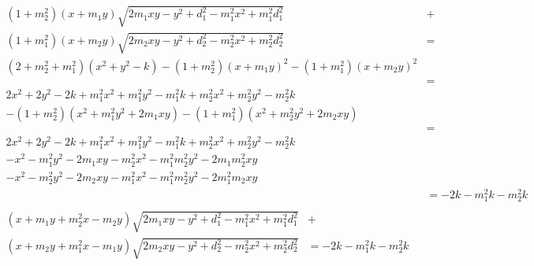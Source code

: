 \documentclass{article}
\begin{document}
\begin{align*}
  (1 + m_2^2)(x + m_1 y)\sqrt{2 m_1 x y - y^2 + d_1^2 - m_1^2 x^2 + m_1^2 d_1^2} &+ \\
  (1 + m_1^2)(x + m_2 y)\sqrt{2 m_2 x y - y^2 + d_2^2 - m_2^2 x^2 + m_2^2 d_2^2} &= \\
  (2 + m_2^2 + m_1^2)(x^2 + y^2 - k) - (1 + m_2^2)(x + m_1 y)^2 - (1 + m_1^2)(x + m_2 y)^2 \\
  &= \\
  2 x^2 + 2 y^2 - 2 k + m_1^2 x^2 + m_1^2 y^2 - m_1^2 k + m_2^2 x^2 + m_2^2 y^2 - m_2^2 k\\
  - (1 + m_2^2)(x^2 + m_1^2 y^2 + 2 m_1 x y) - (1 + m_1^2)(x^2 + m_2^2 y^2 + 2 m_2 x y)\\
  &= \\
  2 x^2 + 2 y^2 - 2 k + m_1^2 x^2 + m_1^2 y^2 - m_1^2 k + m_2^2 x^2 + m_2^2 y^2 - m_2^2 k\\
  - x^2 - m_1^2 y^2 - 2 m_1 x y - m_2^2 x^2 - m_1^2 m_2^2 y^2 - 2 m_1 m_2^2 x y\\
  - x^2 - m_2^2 y^2 - 2 m_2 x y - m_1^2 x^2 - m_1^2 m_2^2 y^2 - 2 m_1^2 m_2 x y\\
  &= - 2 k - m_1^2 k - m_2^2 k\\
\end{align*}
\begin{align*}
  (x + m_1 y + m_2^2 x - m_2 y) \sqrt{2 m_1 x y - y^2 + d_1^2 - m_1^2 x^2 + m_1^2 d_1^2} &+ \\
  (x + m_2 y + m_1^2 x - m_1 y) \sqrt{2 m_2 x y - y^2 + d_2^2 - m_2^2 x^2 + m_2^2 d_2^2} &= - 2 k - m_1^2 k - m_2^2 k\\
\end{align*}
\end{document}
